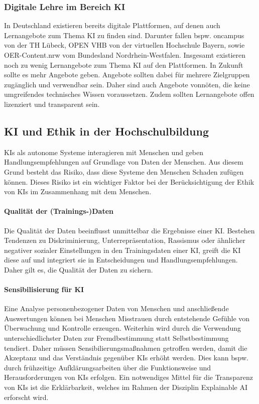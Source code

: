 \subsubsection*{Digitale Lehre im Bereich KI}
In Deutschland existieren bereits digitale Plattformen, auf denen auch Lernangebote zum Thema \ac{KI} zu finden sind.
Darunter fallen bspw. oncampus von der TH Lübeck, OPEN VHB von der virtuellen Hochschule Bayern, sowie OER-Content.nrw vom Bundesland Nordrhein-Westfalen.
Insgesamt existieren noch zu wenig Lernangebote zum Thema \ac{KI} auf den Plattformen. In Zukunft sollte es mehr Angebote geben.
Angebote sollten dabei für mehrere Zielgruppen zugänglich und verwendbar sein. Daher sind auch Angebote vonnöten, die keine umgreifendes technisches Wissen voraussetzen.
Zudem sollten Lernangebote offen lizenziert und transparent sein. \cite*[S. 28ff.]{Witt.2020}

\subsection{KI und Ethik in der Hochschulbildung}
KIs als autonome Systeme interagieren mit Menschen und geben Handlungsempfehlungen auf Grundlage von Daten der Menschen.
Aus diesem Grund besteht das Risiko, dass diese Systeme den Menschen Schaden zufügen können.
Dieses Risiko ist ein wichtiger Faktor bei der Berücksichtigung der Ethik von KIs im Zusammenhang mit dem Menschen. \cite*[S. 38]{Witt.2020}

\paragraph*{Qualität der (Trainings-)Daten}
Die Qualität der Daten beeinflusst unmittelbar die Ergebnisse einer \ac{KI}.
Bestehen Tendenzen zu Diskriminierung, Unterrepräsentation, Rassismus oder ähnlicher negativer sozialer Einstellungen in den Trainingsdaten einer \ac{KI}, greift die \ac{KI} diese auf und integriert sie in Entscheidungen und Handlungsempfehlungen.
Daher gilt es, die Qualität der Daten zu sichern. \cite*[S. 39]{Witt.2020}

\paragraph*{Sensibilisierung für KI}
Eine Analyse personenbezogener Daten von Menschen und anschließende Auswertungen können bei Menschen Misstrauen durch entstehende Gefühle von Überwachung und Kontrolle erzeugen.
Weiterhin wird durch die Verwendung unterschiedlichster Daten zur Fremdbestimmung statt Selbstbestimmung tendiert.
Daher müssen Sensibilierungsmaßnahmen getroffen werden, damit die Akzeptanz und das Verständnis gegenüber KIs erhöht werden.
Dies kann bspw. durch frühzeitige Aufklärungsarbeiten über die Funktionsweise und Herausforderungen von KIs erfolgen.
Ein notwendiges Mittel für die Transparenz von KIs ist die Erklärbarkeit, welches im Rahmen der Disziplin Explainable AI erforscht wird. \cite*[S. 39ff.]{Witt.2020}
